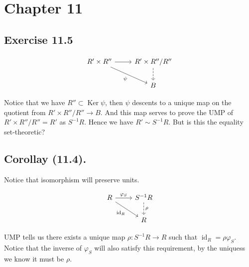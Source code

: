 \section{Chapter 11}

\subsection{Exercise 11.5}

\[\begin{tikzcd}
	{R'\times R''} & {R'\times R''/R''} \\
	& B
	\arrow[from=1-1, to=1-2]
	\arrow["\psi"', from=1-1, to=2-2]
	\arrow[dashed, from=1-2, to=2-2]
\end{tikzcd}\]

Notice that we have $R''\subset \operatorname{Ker}\psi$, then $\psi$ descents to a unique map on the quotient from $R'\times R''/R''\to B$. And this map serves to prove the UMP of $R'\times R''/R''=R'$ as $S^{-1}R$. Hence we have $R'\sim S^{-1}R$. But is this the equality set-theoretic?

\subsection{Corollay (11.4).}

Notice that isomorphism will preserve units.

\[\begin{tikzcd}
	R & {S^{-1}R} \\
	& R
	\arrow["{\varphi_S}", from=1-1, to=1-2]
	\arrow["{\operatorname{id}_R}"', from=1-1, to=2-2]
	\arrow["\rho", dashed, from=1-2, to=2-2]
\end{tikzcd}\]

UMP tells us there exists a unique map $\rho:S^{-1}R\to R$ such that $\operatorname{id}_R=\rho\varphi_S$. Notice that the inverse of $\varphi_S$ will also satisfy this requirement, by the uniquess we know it must be $\rho$.
